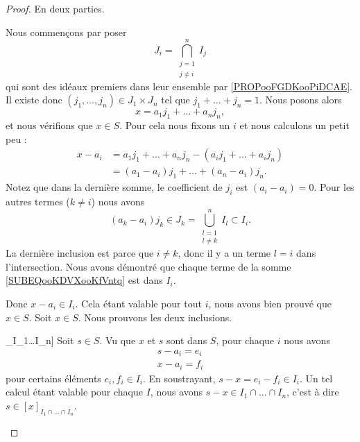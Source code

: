 \begin{proof}
	En deux parties.
	\begin{subproof}
		Nous commençons par poser
		\begin{equation}
			J_i=\bigcap_{\substack{ j=1 \\ j\neq i }  }^nI_j
		\end{equation}
		qui sont des idéaux premiers dans leur ensemble par \ref{PROPooFGDKooPiDCAE}. Il existe donc \( (j_1,\ldots,j_n)\in J_1\times J_n\) tel que \( j_1+\ldots+j_n=1\). Nous posons alors
		\begin{equation}
			x=a_1j_1+\ldots+a_nj_n,
		\end{equation}
		et nous vérifions que \( x\in S\). Pour cela nous fixons un \( i\) et nous calculons un petit peu :
		\begin{subequations}
			\begin{align}
				x-a_i & =a_1j_1+\ldots+a_nj_n-(a_ij_1+\ldots+a_ij_n)                  \\
				      & =(a_1-a_i)j_1+\ldots+(a_n-a_i)j_n.		\label{SUBEQooKDVXooKfVntq}
			\end{align}
		\end{subequations}
		Notez que dans la dernière somme, le coefficient de \( j_i\) est \( (a_i-a_i)=0\). Pour les autres termes (\( k\neq i\)) nous avons
		\begin{equation}
			(a_k-a_i)j_k\in J_k=\bigcup_{\substack{ l=1 \\ l\neq k }  }^nI_l\subset I_i.
		\end{equation}
		La dernière inclusion est parce que \( i\neq k\), donc il y a un terme \( l=i\) dans l'intersection. Nous avons démontré que chaque terme de la somme \eqref{SUBEQooKDVXooKfVntq} est dans \( I_i\).

		Donc \( x-a_i\in I_i\). Cela étant valable pour tout \( i\), nous avons bien prouvé que \( x\in S\).
		Soit \( x\in S\). Nous prouvons les deux inclusions.
		\begin{subproof}
			\spitem[\( S\subset [x]_{I_1\cap\ldots\cap I_n}\)]
			Soit \( s\in S\). Vu que \( x\) et \( s\) sont dans \( S\), pour chaque \( i\) nous avons
			\begin{subequations}
				\begin{align}
					s-a_i=e_i \\
					x-a_i=f_i
				\end{align}
			\end{subequations}
			pour certains éléments \( e_i,f_i\in I_i\). En soustrayant, \( s-x=e_i-f_i\in I_i\). Un tel calcul étant valable pour chaque \( I\), nous avons \( s-x\in I_1\cap\ldots \cap I_n\), c'est à dire \( s\in [x]_{I_1\cap\ldots\cap I_n}\).


\end{subproof}
\end{subproof}
\end{proof}
